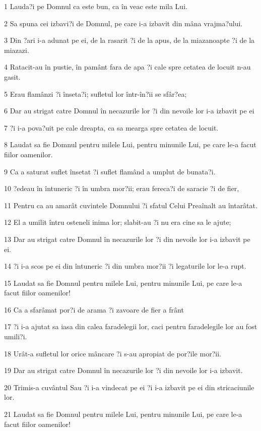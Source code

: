 \par 1 Lauda?i pe Domnul ca este bun, ca în veac este mila Lui.
\par 2 Sa spuna cei izbavi?i de Domnul, pe care i-a izbavit din mâna vrajma?ului.
\par 3 Din ?ari i-a adunat pe ei, de la rasarit ?i de la apus, de la miazanoapte ?i de la miazazi.
\par 4 Ratacit-au în pustie, în pamânt fara de apa ?i cale spre cetatea de locuit n-au gasit.
\par 5 Erau flamânzi ?i înseta?i; sufletul lor într-în?ii se sfâr?ea;
\par 6 Dar au strigat catre Domnul în necazurile lor ?i din nevoile lor i-a izbavit pe ei
\par 7 ?i i-a pova?uit pe cale dreapta, ca sa mearga spre cetatea de locuit.
\par 8 Laudat sa fie Domnul pentru milele Lui, pentru minunile Lui, pe care le-a facut fiilor oamenilor.
\par 9 Ca a saturat suflet însetat ?i suflet flamând a umplut de bunata?i.
\par 10 ?edeau în întuneric ?i în umbra mor?ii; erau fereca?i de saracie ?i de fier,
\par 11 Pentru ca au amarât cuvintele Domnului ?i sfatul Celui Preaînalt au întarâtat.
\par 12 El a umilit întru osteneli inima lor; slabit-au ?i nu era cine sa le ajute;
\par 13 Dar au strigat catre Domnul în necazurile lor ?i din nevoile lor i-a izbavit pe ei.
\par 14 ?i i-a scos pe ei din întuneric ?i din umbra mor?ii ?i legaturile lor le-a rupt.
\par 15 Laudat sa fie Domnul pentru milele Lui, pentru minunile Lui, pe care le-a facut fiilor oamenilor!
\par 16 Ca a sfarâmat por?i de arama ?i zavoare de fier a frânt
\par 17 ?i i-a ajutat sa iasa din calea faradelegii lor, caci pentru faradelegile lor au fost umili?i.
\par 18 Urât-a sufletul lor orice mâncare ?i s-au apropiat de por?ile mor?ii.
\par 19 Dar au strigat catre Domnul în necazurile lor ?i din nevoile lor i-a izbavit.
\par 20 Trimis-a cuvântul Sau ?i i-a vindecat pe ei ?i i-a izbavit pe ei din stricaciunile lor.
\par 21 Laudat sa fie Domnul pentru milele Lui, pentru minunile Lui, pe care le-a facut fiilor oamenilor!
